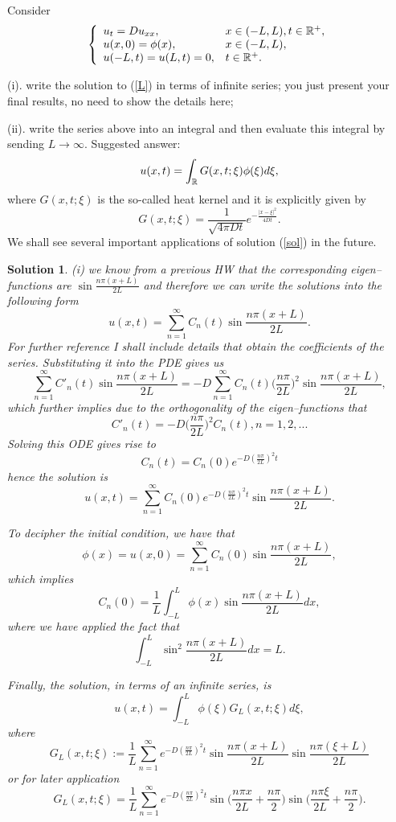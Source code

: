 \documentclass[6pt]{article}
\newtheorem{solution}{Solution}
\numberwithin{equation}{section}
\def\mathbb{\Bbb}
\begin{document}
\begin{enumerate}
Consider
\begin{equation}\label{L}
\left\{
\begin{array}{ll}
u_t=D u_{xx},& x\in (-L,L), t\in\mathbb R^+,\\
u(x,0)=\phi(x),&x \in (-L,L),\\
u(-L,t)=u(L,t)=0,& t\in\mathbb R^+.\\
\end{array}
\right.
\end{equation}

(i).  write the solution to (\ref{L}) in terms of infinite series; you just present your final results, no need to show the details here;

(ii).  write the series above into an integral and then evaluate this integral by sending $L\rightarrow \infty$.  Suggested answer:
\begin{equation}\label{sol}
u(x,t)=\int_{\mathbb R}G(x,t;\xi)\phi(\xi)d\xi,
\end{equation}
where $G(x,t;\xi)$ is the so-called heat kernel and it is explicitly given by
\[G(x,t;\xi)=\frac{1}{\sqrt{4\pi Dt}}e^{-\frac{|x-\xi|^2}{4Dt}}.\]
We shall see several important applications of solution (\ref{sol}) in the future.
\begin{solution}
(i) we know from a previous HW that the corresponding eigen--functions are $\sin \frac{n\pi (x+L)}{2L}$ and therefore we can write the solutions into the following form
\[u(x,t)=\sum_{n=1}^\infty C_n(t)\sin \frac{n\pi (x+L)}{2L}.\]
For further reference I shall include details that obtain the coefficients of the series.  Substituting it into the PDE gives us
\[\sum_{n=1}^\infty C'_n(t)\sin \frac{n\pi (x+L)}{2L}=-D\sum_{n=1}^\infty C_n(t)\Big(\frac{n\pi}{2L}\Big)^2\sin \frac{n\pi (x+L)}{2L},\]
which further implies due to the orthogonality of the eigen--functions that
\[C'_n(t)=-D\Big(\frac{n\pi}{2L}\Big)^2C_n(t),n=1,2,...\]
Solving this ODE gives rise to
\[C_n(t)=C_n(0)e^{-D(\frac{n\pi}{2L})^2t}\]
hence the solution is
\[u(x,t)=\sum_{n=1}^\infty C_n(0)e^{-D(\frac{n\pi}{2L})^2t}\sin \frac{n\pi (x+L)}{2L}.\]

To decipher the initial condition, we have that
\[\phi(x)=u(x,0)=\sum_{n=1}^\infty C_n(0)\sin \frac{n\pi (x+L)}{2L},\]
which implies
\[C_n(0)=\frac{1}{L}\int_{-L}^L\phi(x)\sin \frac{n\pi (x+L)}{2L}dx,\]
where we have applied the fact that
\[\int_{-L}^L \sin^2 \frac{n\pi (x+L)}{2L}dx=L.\]

Finally, the solution, in terms of an infinite series, is
\[u(x,t)=\int_{-L}^L\phi(\xi)G_L(x,t;\xi)d\xi,\]
where
\[G_L(x,t;\xi):=\frac{1}{L}\sum_{n=1}^\infty e^{-D(\frac{n\pi}{2L})^2t}\sin \frac{n\pi (x+L)}{2L} \sin \frac{n\pi (\xi+L)}{2L}\]
or for later application
\begin{equation}\label{Gl}
G_L(x,t;\xi)=\frac{1}{L}\sum_{n=1}^\infty e^{-D(\frac{n\pi}{2L})^2t}\sin \Big(\frac{n\pi x}{2L}+\frac{n\pi}{2}\Big)\sin \Big(\frac{n\pi \xi}{2L}+\frac{n\pi}{2}\Big).
\end{equation}


\end{solution}
\end{enumerate}
\end{document}
